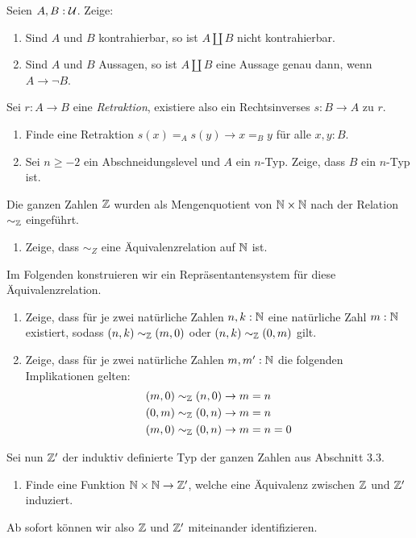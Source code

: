 \documentclass{uebung}
\begin{document}

\begin{exercise}
  Seien $A,B:\mathcal{U}$.
  Zeige:
  \begin{enumerate}
    \item Sind $A$ und $B$ kontrahierbar, so ist $A \amalg B$ nicht kontrahierbar.
    \item Sind $A$ und $B$ Aussagen, so ist $A \amalg B$ eine Aussage genau dann, wenn $A \to \neg B$.
  \end{enumerate}
\end{exercise}

\begin{exercise}
  Sei $r:A \to B$ eine \emph{Retraktion}, existiere also ein Rechtsinverses $s:B \to A$ zu $r$.
  \begin{enumerate}
    \item Finde eine Retraktion $s(x) =_A s(y) \to x=_B y$ für alle $x,y:B$.
    \item Sei $n\geq -2$ ein Abschneidungslevel und $A$ ein $n$-Typ.
      Zeige, dass $B$ ein $n$-Typ ist.
  \end{enumerate}
\end{exercise}

\begin{exercise}
  Die ganzen Zahlen $\mathbb{Z}$ wurden als Mengenquotient von $\mathbb{N}\times\mathbb{N}$ nach der Relation $\sim_{\mathbb{Z}}$ eingeführt.
  \begin{enumerate}
    \item Zeige, dass $\sim_Z$ eine Äquivalenzrelation auf $\mathbb{N}$ ist.
  \end{enumerate}
  Im Folgenden konstruieren wir ein Repräsentantensystem für diese Äquivalenzrelation.
  \begin{enumerate}[start=2]
    \item Zeige, dass für je zwei natürliche Zahlen $n,k:\mathbb{N}$ eine natürliche Zahl $m:\mathbb{N}$ existiert, sodass $(n,k) \sim_{\mathbb{Z}} (m,0)$ oder $(n,k) \sim_{\mathbb{Z}} (0,m)$ gilt.
    \item Zeige, dass für je zwei natürliche Zahlen $m,m':\mathbb{N}$ die folgenden Implikationen gelten:
      \begin{align*}
        (m,0) \sim_{\mathbb{Z}} (n,0) &\to m=n\\
        (0,m) \sim_{\mathbb{Z}} (0,n) &\to m=n\\
        (m,0) \sim_{\mathbb{Z}} (0,n) &\to m=n=0
      \end{align*}
  \end{enumerate}
  Sei nun $\mathbb{Z}'$ der induktiv definierte Typ der ganzen Zahlen aus Abschnitt 3.3.
  \begin{enumerate}[start=4]
    \item Finde eine Funktion $\mathbb{N}\times\mathbb{N}\to\mathbb{Z}'$, welche eine Äquivalenz zwischen $\mathbb{Z}$ und $\mathbb{Z}'$ induziert.
  \end{enumerate}
  Ab sofort können wir also $\mathbb{Z}$ und $\mathbb{Z}'$ miteinander identifizieren.
\end{exercise}

\begin{exercise}
\end{exercise}
\end{document}
